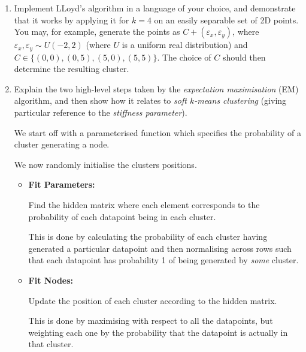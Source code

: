 \documentclass[10pt,\jkfside,a4paper]{article}
\begin{document}
\begin{enumerate}
    \item Implement LLoyd's algorithm in a language of your choice, and demonstrate that it works by applying it for $k = 4$ on an easily separable set of 2D points. You may, for example, generate the points as
    $C + (\varepsilon_x, \varepsilon_y)$, where $\varepsilon_x, \varepsilon_y \sim U(-2, 2)$ (where $U$ is a uniform real distribution) and $C \in \{(0, 0), (0, 5), (5, 0), (5, 5)\}$. The choice of $C$ should
    then determine the resulting cluster.

    

    \item Explain the two high-level steps taken by the \textit{expectation maximisation} (EM) algorithm, and then show how it relates to \textit{soft $k$-means clustering} (giving particular reference to the
    \textit{stiffness parameter}).

    We start off with a parameterised function which specifies the probability of a cluster generating a node.

    We now randomly initialise the clusters positions.

    \begin{itemize}

        \item \textbf{Fit Parameters:}

        Find the hidden matrix where each element corresponds to the probability of each datapoint being in each cluster.

        This is done by calculating the probability of each cluster having generated a particular datapoint and then normalising across rows such that each datapoint has probability 1 of being generated by
        \textit{some} cluster.

        \item \textbf{Fit Nodes:}

        Update the position of each cluster according to the hidden matrix.

        This is done by maximising with respect to all the datapoints, but weighting each one by the probability that the datapoint is actually in that cluster.

    \end{itemize}


\end{enumerate}
\end{document}
